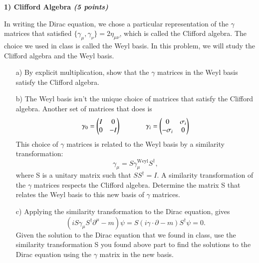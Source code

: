 {\large
\textbf{1) Clifford Algebra \hfill \textit{(5 points)} }

In writing the Dirac equation, we chose a particular representation of the $\gamma$ matrices that satisfied $\{\gamma_\mu,\gamma_\nu\} = 2\eta_{\mu\nu}$, which is called the Clifford algebra. 
The choice we used in class is called the Weyl basis. In this problem, we will study the Clifford algebra and the Weyl basis.
\begin{itemize}
\item[a)]
By explicit multiplication, show that the $\gamma$ matrices in the Weyl basis satisfy the Clifford algebra.
\item[b)]
The Weyl basis isn’t the unique choice of matrices that satisfy the Clifford algebra. 
Another set of matrices that does is
\begin{equation*}
\gamma_0 = \begin{pmatrix} I &  0 \\ 0 & -I \end{pmatrix} \hspace{0.5in} \gamma_i = \begin{pmatrix} 0 & \sigma_i \\  -\sigma_i & 0 \end{pmatrix}
\end{equation*}
This choice of $\gamma$ matrices is related to the Weyl basis by a similarity transformation:
\begin{equation*}
\gamma_\mu = S\gamma_\mu^{\mathrm{Weyl}}S^\dagger, 
\end{equation*}
where S is a unitary matrix such that $SS^\dagger = I$.
A similarity transformation of the $\gamma$ matrices respects the Clifford algebra. 
Determine the matrix S that relates the Weyl basis to this new basis of $\gamma$ matrices.

\item[c)]
 Applying the similarity transformation to the Dirac equation, gives 
\begin{equation*}
(i S \gamma_\mu S^\dagger \partial^{\mu} - m)\psi = S(i\gamma \cdot \partial - m)S^\dagger\psi = 0.
\end{equation*}
Given the solution to the Dirac equation that we found in class, use the similarity transformation S you found above part to find the solutions to the Dirac equation using the $\gamma$ matrix in the new basis.
\end{itemize}

\vspace*{0.25in}

}
